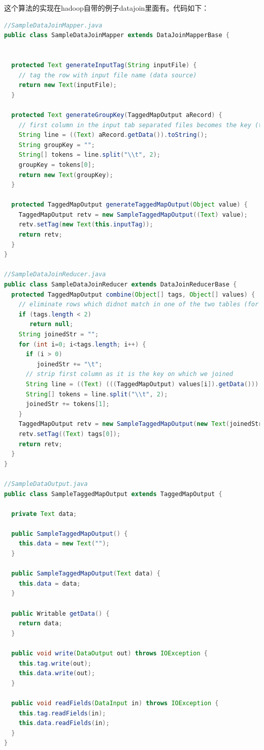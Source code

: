 这个算法的实现在hadoop自带的例子datajoin里面有。代码如下：
\begin{lstlisting}[language=Java]
//SampleDataJoinMapper.java
public class SampleDataJoinMapper extends DataJoinMapperBase {


  protected Text generateInputTag(String inputFile) {
    // tag the row with input file name (data source)
    return new Text(inputFile);
  }

  protected Text generateGroupKey(TaggedMapOutput aRecord) {
    // first column in the input tab separated files becomes the key (to perform the JOIN)
    String line = ((Text) aRecord.getData()).toString();
    String groupKey = "";
    String[] tokens = line.split("\\t", 2);
    groupKey = tokens[0];
    return new Text(groupKey);
  }

  protected TaggedMapOutput generateTaggedMapOutput(Object value) {
    TaggedMapOutput retv = new SampleTaggedMapOutput((Text) value);
    retv.setTag(new Text(this.inputTag));
    return retv;
  }
}

//SampleDataJoinReducer.java
public class SampleDataJoinReducer extends DataJoinReducerBase {
  protected TaggedMapOutput combine(Object[] tags, Object[] values) {
    // eliminate rows which didnot match in one of the two tables (for INNER JOIN)
    if (tags.length < 2)
       return null;  
    String joinedStr = ""; 
    for (int i=0; i<tags.length; i++) {
      if (i > 0)
         joinedStr += "\t";
      // strip first column as it is the key on which we joined
      String line = ((Text) (((TaggedMapOutput) values[i]).getData())).toString();
      String[] tokens = line.split("\\t", 2);
      joinedStr += tokens[1];
    }
    TaggedMapOutput retv = new SampleTaggedMapOutput(new Text(joinedStr));
    retv.setTag((Text) tags[0]); 
    return retv;
  }
}

//SampleDataOutput.java
public class SampleTaggedMapOutput extends TaggedMapOutput {

  private Text data;

  public SampleTaggedMapOutput() {
    this.data = new Text("");
  }

  public SampleTaggedMapOutput(Text data) {
    this.data = data;
  }

  public Writable getData() {
    return data;
  }

  public void write(DataOutput out) throws IOException {
    this.tag.write(out);
    this.data.write(out);
  }

  public void readFields(DataInput in) throws IOException {
    this.tag.readFields(in);
    this.data.readFields(in);
  }
}
\end{lstlisting}

